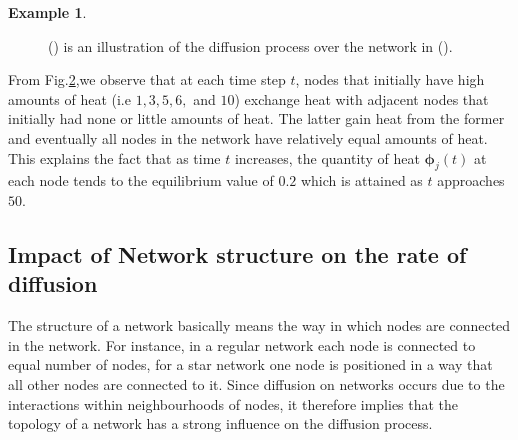 \documentclass[10pt,a4paper]{article}
\theoremstyle{plain}
\theoremstyle{definition}
\newtheorem{exa}[subsection]{Example}
\begin{document}
\begin{exa}
\begin{figure}[H]
\begin{subfigure}[b]{0.45\textwidth}
    	 			\caption{}
    	 			\label{difn-plot}
    	 		\end{subfigure}
    	 		\caption{() is an illustration of the diffusion process over the network in (). }
    	 		\label{graph-plot}
    	 	\end{figure}
     	  From Fig.\ref{graph-plot},we observe that at each time step $t$, nodes that initially have high amounts of heat (i.e $1,3,5,6,$ and $10$) exchange heat with adjacent nodes that initially had none or little amounts of heat. The latter gain heat from the former and eventually all nodes in the network have relatively equal amounts of heat. This explains the fact that as time $t$ increases, the quantity of heat $\boldsymbol{\phi}_j(t)$ at each node tends to the equilibrium value of $0.2$ which is attained as $t$ approaches $50$. 
    	 \end{exa}
     
     \subsection{Impact of Network structure on the rate of diffusion}
     The structure of a network basically means the way in which nodes are connected in the network. For instance, in a regular network each node is connected to equal number of nodes, for a star network one node is positioned in a way that all other nodes are connected to it. Since diffusion on networks occurs due to the interactions within neighbourhoods of nodes, it therefore implies that the topology of a network has a strong influence on the diffusion process. 
     
\end{document}
